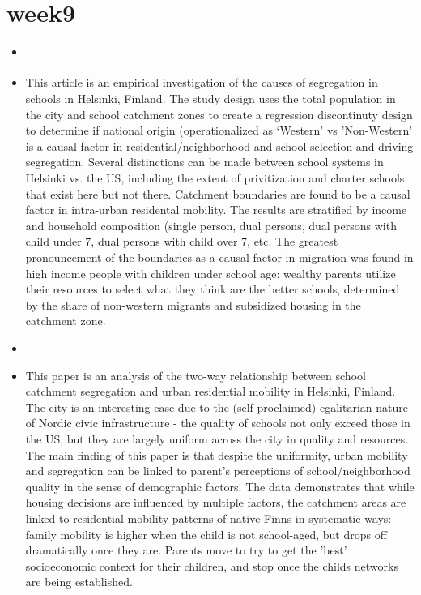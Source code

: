 \documentclass{article} \usepackage{filecontents}
\begin{document}
\section{week9}
\begin{itemize}
\item \cite{kauppinen2022UnderstandingEffects}
\item This article is an empirical investigation of the causes of
  segregation in schools in Helsinki, Finland. The study design uses
  the total population in the city and school catchment zones to
  create a regression discontinuty design to determine if national
  origin (operationalized as `Western' vs 'Non-Western' is a causal
  factor in residential/neighborhood and school selection and driving
  segregation. Several distinctions can be made between school systems
  in Helsinki vs. the US, including the extent of privitization and
  charter schools that exist here but not there. Catchment boundaries
  are found to be a causal factor in intra-urban residental
  mobility. The results are stratified by income and household
  composition (single person, dual persons, dual persons with child
  under 7, dual persons with child over 7, etc. The greatest
  pronouncement of the boundaries as a causal factor in migration was
  found in high income people with children under school age: wealthy
  parents utilize their resources to select what they think are the
  better schools, determined by the share of non-western migrants and
  subsidized housing in the catchment zone.

\item \cite{bernelius2019PupilsMove}
\item This paper is an analysis of the two-way relationship between
  school catchment segregation and urban residential mobility in
  Helsinki, Finland. The city is an interesting case due to the
  (self-proclaimed) egalitarian nature of Nordic civic infrastructure
  - the quality of schools not only exceed those in the US, but they
  are largely uniform across the city in quality and resources. The
  main finding of this paper is that despite the uniformity, urban
  mobility and segregation can be linked to parent's perceptions of
  school/neighborhood quality in the sense of demographic factors. The
  data demonstrates that while housing decisions are influenced by
  multiple factors, the catchment areas are linked to residential
  mobility patterns of native Finns in systematic ways: family
  mobility is higher when the child is not school-aged, but drops off
  dramatically once they are. Parents move to try to get the 'best'
  socioeconomic context for their children, and stop once the childs
  networks are being established.
  
\end{itemize}
\end{document}
